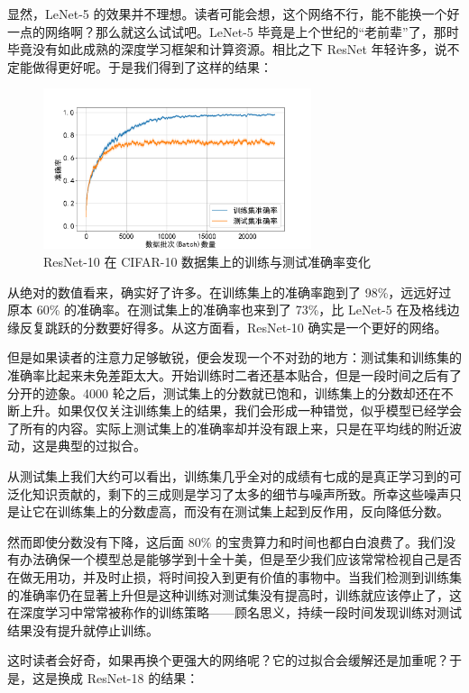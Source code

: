 显然，LeNet-5 的效果并不理想。读者可能会想，这个网络不行，能不能换一个好一点的网络啊？那么就这么试试吧。LeNet-5 毕竟是上个世纪的“老前辈”了，那时毕竟没有如此成熟的深度学习框架和计算资源。相比之下 ResNet 年轻许多，说不定能做得更好呢。于是我们得到了这样的结果：

\begin{figure}[H]
    \centering
    \includegraphics[width=0.7\textwidth]{img/resnet10_cifar10.png}
    \caption{ResNet-10 在 CIFAR-10 数据集上的训练与测试准确率变化}
    \label{fig:resnet10-cifar10-accuracy}
\end{figure}

从绝对的数值看来，确实好了许多。在训练集上的准确率跑到了 98\%，远远好过原本 60\% 的准确率。在测试集上的准确率也来到了 73\%，比 LeNet-5 在及格线边缘反复跳跃的分数要好得多。从这方面看，ResNet-10 确实是一个更好的网络。

但是如果读者的注意力足够敏锐，便会发现一个不对劲的地方：测试集和训练集的准确率比起来未免差距太大。开始训练时二者还基本贴合，但是一段时间之后有了分开的迹象。4000 轮之后，测试集上的分数就已饱和，训练集上的分数却还在不断上升。如果仅仅关注训练集上的结果，我们会形成一种错觉，似乎模型已经学会了所有的内容。实际上测试集上的准确率却并没有跟上来，只是在平均线的附近波动，这是典型的过拟合。

从测试集上我们大约可以看出，训练集几乎全对的成绩有七成的是真正学习到的可泛化知识贡献的，剩下的三成则是学习了太多的细节与噪声所致。所幸这些噪声只是让它在训练集上的分数虚高，而没有在测试集上起到反作用，反向降低分数。

然而即使分数没有下降，这后面 80\% 的宝贵算力和时间也都白白浪费了。我们没有办法确保一个模型总是能够学到十全十美，但是至少我们应该常常检视自己是否在做无用功，并及时止损，将时间投入到更有价值的事物中。当我们检测到训练集的准确率仍在显著上升但是这种训练对测试集没有提高时，训练就应该停止了，这在深度学习中常常被称作的训练策略——顾名思义，持续一段时间发现训练对测试结果没有提升就停止训练。

这时读者会好奇，如果再换个更强大的网络呢？它的过拟合会缓解还是加重呢？于是，这是换成 ResNet-18 的结果：

